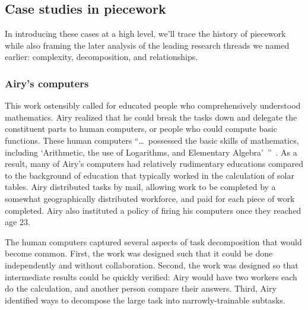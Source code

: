 \documentclass[trackingWork]{subfiles}
\begin{document}
\subsection{Case studies in piecework}
In introducing these cases at a high level,
we'll trace the history of piecework
while also framing the later analysis of the leading research threads we named earlier:
complexity, decomposition, and relationships.

\subsubsection{Airy's computers}

\begin{comment}
What did I pull from the threads that are related to industrial and railroad workers (i.e. 1920 onward?)

- Airy and his human computers were great:
  - quickly verifiable
  - independent tasks (could be checked without the whole product)
  - narrowly trainable

\end{comment}

This work ostensibly called for educated people who comprehensively understood mathematics.
Airy realized that he could break the tasks down and delegate the constituent parts
to human computers, or people who could compute basic functions.
These human computers ``\dots~possessed the basic skills of mathematics,
including `Arithmetic, the use of Logarithms, and Elementary Algebra'~''~\cite{grier2013computers}.
As a result, many of Airy's computers had relatively rudimentary educations
compared to the background of education that typically worked in the calculation of solar tables.
Airy distributed tasks by mail,
allowing work to be completed by a somewhat geographically distributed workforce,
and paid for each piece of work completed.
Airy also instituted a policy of firing his computers once they reached age 23.

The human computers captured several aspects of task decomposition that would become common. 
First, the work was designed such that it could be done independently and without collaboration. 
Second, the work was designed so that intermediate results could be quickly verified: Airy would have two workers each do the calculation, and another person compare their answers.
Third, Airy identified ways to decompose the large task into narrowly-trainable subtasks.
\end{document}

